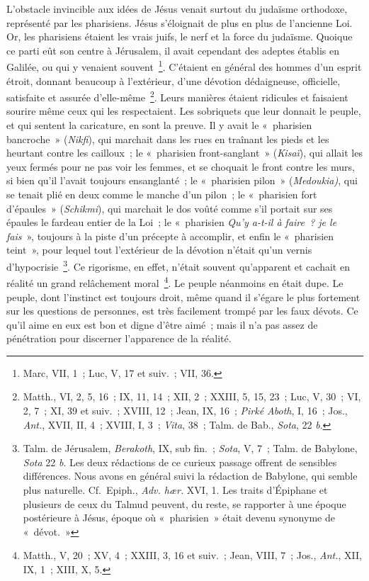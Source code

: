 \documentclass[french,twoside]{book} %
\begin{document}
L’obstacle invincible aux idées de Jésus venait surtout du judaïsme orthodoxe, représenté par les pharisiens. Jésus s’éloignait de plus en plus de l’ancienne Loi. Or, les pharisiens étaient les vrais juifs, le nerf et la force du judaïsme. Quoique ce parti eût son centre à Jérusalem, il avait cependant des adeptes établis en Galilée, ou qui y venaient souvent \footnote{Marc, VII, 1 ; Luc, V, 17 et suiv. ; VII, 36.}. C’étaient en général des hommes d’un esprit étroit, donnant beaucoup à l’extérieur, d’une dévotion dédaigneuse, officielle, satisfaite et assurée d’elle-même \footnote{ Matth., VI, 2, 5, 16 ; IX, 11, 14 ; XII, 2 ; XXIII, 5, 15, 23 ; Luc, V, 30 ; VI, 2, 7 ; XI, 39 et suiv. ; XVIII, 12 ; Jean, IX, 16 ; {\itshape Pirké Aboth}, I, 16 ; Jos., {\itshape Ant.}, XVII, II, 4 ; XVIII, I, 3 ; {\itshape Vita}, 38 ; Talm. de Bab., {\itshape Sota}, 22 {\itshape b}.}. Leurs manières étaient ridicules et faisaient sourire même ceux qui les respectaient. Les sobriquets que leur donnait le peuple, et qui sentent la caricature, en sont la preuve. Il y avait le « pharisien bancroche » ({\itshape Nikfi}), qui marchait dans les rues en traînant les pieds et les heurtant contre les cailloux ; le « pharisien front-sanglant » ({\itshape Kisaï}), qui allait les yeux fermés pour ne pas voir les femmes, et se choquait le front contre les murs, si bien qu’il l’avait toujours ensanglanté ; le « pharisien pilon » ({\itshape Medoukia)}, qui se tenait plié en deux comme le manche d’un pilon ; le « pharisien fort d’épaules » ({\itshape Schikmi}), qui marchait le dos voûté comme s’il portait sur ses épaules le fardeau entier de la Loi ; le « pharisien {\itshape Qu’y a-t-il à faire ? je le fais} », toujours à la piste d’un précepte à accomplir, et enfin le « pharisien teint », pour lequel tout l’extérieur de la dévotion n’était qu’un vernis d’hypocrisie \footnote{ Talm. de Jérusalem, {\itshape Berakoth}, IX, sub fin. ; {\itshape Sota}, V, 7 ; Talm. de Babylone, {\itshape Sota} 22 {\itshape b}. Les deux rédactions de ce curieux passage offrent de sensibles différences. Nous avons en général suivi la rédaction de Babylone, qui semble plus naturelle. Cf. Epiph., {\itshape Adv. hær.} XVI, 1. Les traits d’Épiphane et plusieurs de ceux du Talmud peuvent, du reste, se rapporter à une époque postérieure à Jésus, époque où « pharisien » était devenu synonyme de « dévot. »}. Ce rigorisme, en effet, n’était souvent qu’apparent et cachait en réalité un grand relâchement moral \footnote{ Matth., V, 20 ; XV, 4 ; XXIII, 3, 16 et suiv. ; Jean, VIII, 7 ; Jos., {\itshape Ant.}, XII, IX, 1 ; XIII, X, 5.}. Le peuple néanmoins en était dupe. Le peuple, dont l’instinct est toujours droit, même quand il s’égare le plus fortement sur les questions de personnes, est très facilement trompé par les faux dévots. Ce qu’il aime en eux est bon et digne d’être aimé ; mais il n’a pas assez de pénétration pour discerner l’apparence de la réalité.\par
\end{document}
